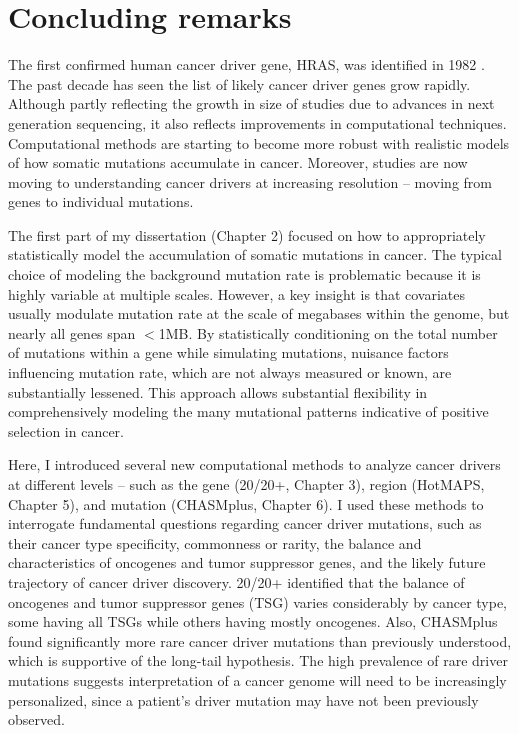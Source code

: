 
\chapter{Concluding remarks}
\label{chap:ch8}

The first confirmed human cancer driver gene, HRAS, was identified in 1982 \cite{RN21, RN19}. The past decade has seen the list of likely cancer driver genes grow rapidly. Although partly reflecting the growth in size of studies due to advances in next generation sequencing, it also reflects improvements in computational techniques. Computational methods are starting to become more robust with realistic models of how somatic mutations accumulate in cancer. Moreover, studies are now moving to understanding cancer drivers at increasing resolution -- moving from genes to individual mutations.

The first part of my dissertation (Chapter 2) focused on how to appropriately statistically model the accumulation of somatic mutations in cancer. The typical choice of modeling the background mutation rate is problematic because it is highly variable at multiple scales. However, a key insight is that covariates usually modulate mutation rate at the scale of megabases within the genome, but nearly all genes span $<$1MB. By statistically conditioning on the total number of mutations within a gene while simulating mutations, nuisance factors influencing mutation rate, which are not always measured or known, are substantially lessened. This approach allows substantial flexibility in comprehensively modeling the many mutational patterns indicative of positive selection in cancer.

Here, I introduced several new computational methods to analyze cancer drivers at different levels -- such as the gene (20/20+, Chapter 3), region (HotMAPS, Chapter 5), and mutation (CHASMplus, Chapter 6). I used these methods to interrogate fundamental questions regarding cancer driver mutations, such as their cancer type specificity, commonness or rarity, the balance and characteristics of oncogenes and tumor suppressor genes, and the likely future trajectory of cancer driver discovery. 20/20+ identified that the balance of oncogenes and tumor suppressor genes (TSG) varies considerably by cancer type, some having all TSGs while others having mostly oncogenes. Also, CHASMplus found significantly more rare cancer driver mutations than previously understood, which is supportive of the long-tail hypothesis. The high prevalence of rare driver mutations suggests interpretation of a cancer genome will need to be increasingly personalized, since a patient’s driver mutation may have not been previously observed. 

